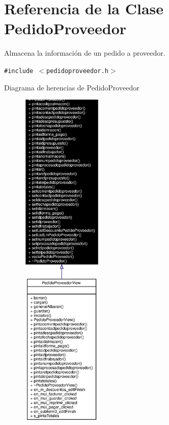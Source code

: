 \section{Referencia de la Clase Pedido\-Proveedor}
\label{classPedidoProveedor}
Almacena la informaci\'{o}n de un pedido a proveedor.  


{\tt \#include $<$pedidoproveedor.h$>$}

Diagrama de herencias de Pedido\-Proveedor\begin{figure}[H]
\begin{center}
\leavevmode
\includegraphics[width=110pt]{classPedidoProveedor__inherit__graph}
\end{center}
\end{figure}
